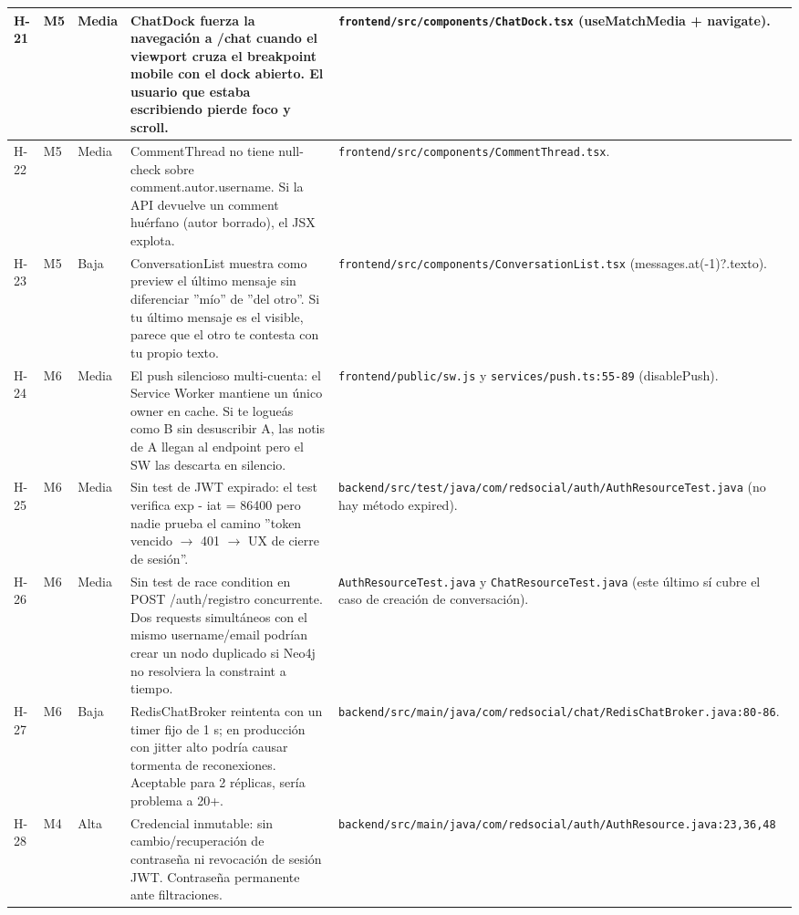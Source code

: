 \documentclass[10pt,a4paper]{article}
\newcommand{\code}[1]{\nolinkurl{#1}}
\begin{document}
\begin{xltabular}{\textwidth}{p{1.0cm} p{1.1cm} p{1.6cm} X >{\raggedright\arraybackslash}p{4.7cm}}
H-21 & M5 & Media & ChatDock fuerza la navegación a /chat cuando el viewport cruza el breakpoint mobile con el dock abierto. El usuario que estaba escribiendo pierde foco y scroll. & \code{frontend/src/components/ChatDock.tsx} (useMatchMedia + navigate). \\ \midrule
H-22 & M5 & Media & CommentThread no tiene null-check sobre comment.autor.username. Si la API devuelve un comment huérfano (autor borrado), el JSX explota. & \code{frontend/src/components/CommentThread.tsx}. \\ \midrule
H-23 & M5 & Baja & ConversationList muestra como preview el último mensaje sin diferenciar ''mío'' de ''del otro''. Si tu último mensaje es el visible, parece que el otro te contesta con tu propio texto. & \code{frontend/src/components/ConversationList.tsx} (messages.at(-1)?.texto). \\ \midrule
H-24 & M6 & Media & El push silencioso multi-cuenta: el Service Worker mantiene un único owner en cache. Si te logueás como B sin desuscribir A, las notis de A llegan al endpoint pero el SW las descarta en silencio. & \code{frontend/public/sw.js} y \code{services/push.ts:55-89} (disablePush). \\ \midrule
H-25 & M6 & Media & Sin test de JWT expirado: el test verifica exp - iat = 86400 pero nadie prueba el camino ''token vencido $\rightarrow$ 401 $\rightarrow$ UX de cierre de sesión''. & \code{backend/src/test/java/com/redsocial/auth/AuthResourceTest.java} (no hay método expired). \\ \midrule
H-26 & M6 & Media & Sin test de race condition en POST /auth/registro concurrente. Dos requests simultáneos con el mismo username/email podrían crear un nodo duplicado si Neo4j no resolviera la constraint a tiempo. & \code{AuthResourceTest.java} y \code{ChatResourceTest.java} (este último sí cubre el caso de creación de conversación). \\ \midrule
H-27 & M6 & Baja & RedisChatBroker reintenta con un timer fijo de 1 s; en producción con jitter alto podría causar tormenta de reconexiones. Aceptable para 2 réplicas, sería problema a 20+. & \code{backend/src/main/java/com/redsocial/chat/RedisChatBroker.java:80-86}. \\ \midrule
H-28 & M4 & Alta & Credencial inmutable: sin cambio/recuperación de contraseña ni revocación de sesión JWT. Contraseña permanente ante filtraciones. & \code{backend/src/main/java/com/redsocial/auth/AuthResource.java:23,36,48} \\ \midrule
\end{xltabular}
\vspace{1em}
\end{document}

